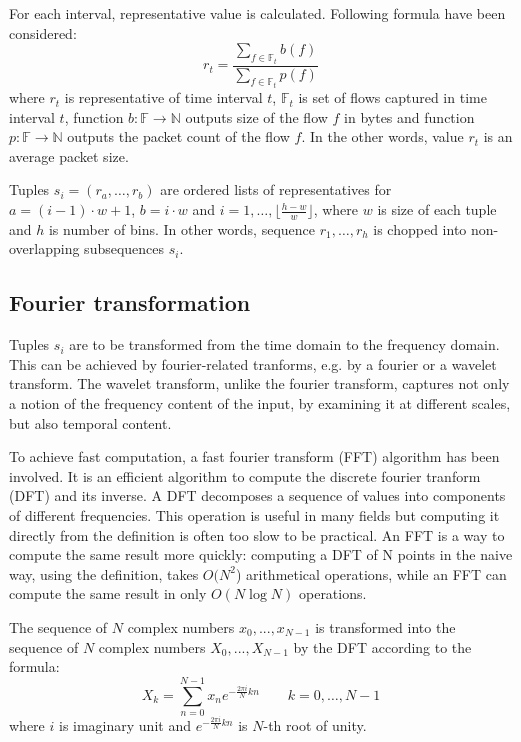 \documentclass[a4paper,journal]{IEEEtran}
\begin{document}
For each interval,
representative value is calculated. Following formula have been considered:
\begin{equation}
r_t = \frac{\sum\limits_{f\in \mathbb{F}_t}b(f)}{\sum\limits_{f\in \mathbb{F}_t}p(f)}
\end{equation}
where $r_t$ is representative of time interval $t$, $\mathbb{F}_t$ is set of flows captured in time 
interval $t$, function $b:\mathbb{F} \rightarrow \mathbb{N}$ outputs size of the flow $f$ in bytes and function 
$p:\mathbb{F} \rightarrow \mathbb{N}$ outputs the packet count of the flow $f$. 
In the other words, value $r_t$ is an average packet size. 

Tuples $s_i = (r_a, \ldots, r_b)$ are ordered lists of representatives for
$a = (i-1)\cdot w +1 $, $b = i\cdot w $ and $ i = 1, \ldots, \lfloor \frac{h-w}{w} \rfloor$,
where $w$ is size of each tuple and $h$ is number of bins. In other words, sequence $r_1,\ldots,r_h$
is chopped into non-overlapping subsequences $s_i$.



\subsection{Fourier transformation}
Tuples $s_i$ are to be transformed from the time domain to the frequency domain.
This can be achieved by fourier-related tranforms, e.g. by a fourier or a wavelet transform.
The wavelet transform, unlike the fourier transform, captures
not only a notion of the frequency content of the input, by
examining it at different scales, but also temporal content.

To achieve fast computation, a fast fourier transform (FFT) algorithm has been involved.
It is an efficient algorithm to compute the discrete fourier tranform (DFT) and its inverse.
A DFT decomposes a sequence of values into components of different frequencies. 
This operation is useful in many fields but computing it directly from the definition is often 
too slow to be practical.
An FFT is a way to compute the same result more quickly: 
computing a DFT of N points in the naive way, using the definition, takes $O(N^2$) arithmetical 
operations, while an FFT can compute the same result in only $ O(N \log N)$ operations.

The sequence of $N$ complex numbers $x_0, ..., x_{N−1}$ is transformed into the
sequence of $N$ complex numbers $X_0, ..., X_{N−1}$ by the DFT according to the
formula:
\begin{equation}
X_k = \sum_{n=0}^{N-1} x_n e^{-\frac{2 \pi i}{N} k n} \quad \quad k = 0, \dots, N-1
\end{equation}
where $i$ is imaginary unit and $e^{-\frac{2 \pi i}{N} k n}$ is $N$-th root of unity.
\end{document}
